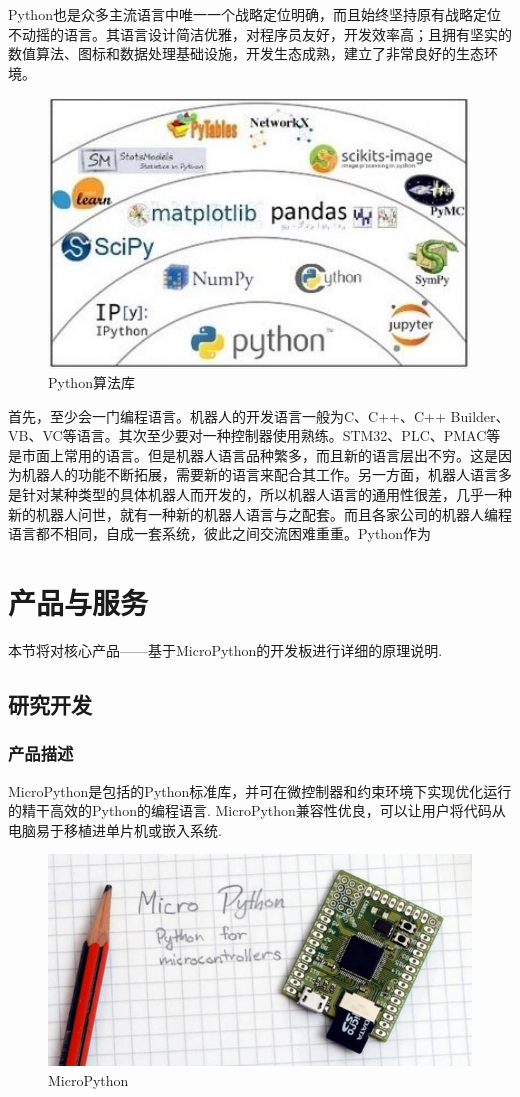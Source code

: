 \documentclass[UTF-8,12pt,a4paper]{ctexart}
\begin{document}
Python也是众多主流语言中唯一一个战略定位明确，而且始终坚持原有战略定位不动摇的语言。其语言设计简洁优雅，对程序员友好，开发效率高；且拥有坚实的数值算法、图标和数据处理基础设施，开发生态成熟，建立了非常良好的生态环境。
\begin{figure}[H]
\centering
\includegraphics[width=12cm]{3_pythonquantu.jpg}
\caption{Python算法库}
\label{Python算法库}
\end{figure}

首先，至少会一门编程语言。机器人的开发语言一般为C、C++、C++ Builder、VB、VC等语言。其次至少要对一种控制器使用熟练。STM32、PLC、PMAC等是市面上常用的语言。但是机器人语言品种繁多，而且新的语言层出不穷。这是因为机器人的功能不断拓展，需要新的语言来配合其工作。另一方面，机器人语言多是针对某种类型的具体机器人而开发的，所以机器人语言的通用性很差，几乎一种新的机器人问世，就有一种新的机器人语言与之配套。而且各家公司的机器人编程语言都不相同，自成一套系统，彼此之间交流困难重重。Python作为

\section{产品与服务}
本节将对核心产品——基于MicroPython的开发板进行详细的原理说明.
\subsection{研究开发}
\subsubsection{产品描述}
MicroPython是包括的Python标准库，并可在微控制器和约束环境下实现优化运行的精干高效的Python的编程语言.
MicroPython兼容性优良，可以让用户将代码从电脑易于移植进单片机或嵌入系统.

\begin{figure}[H]
\centering
\includegraphics[width=12cm]{3.0.jpg}
\caption{MicroPython}
\label{MicroPython}
\end{figure}
\end{document}
